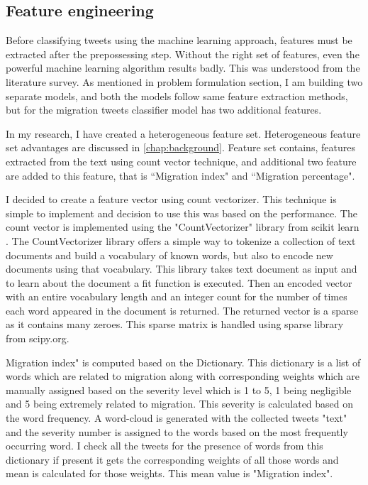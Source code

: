 \subsection{Feature engineering} \label{featureengineering}


 
Before classifying tweets using the machine learning approach, features must be extracted after the prepossessing step. Without the right set of features, even the powerful machine learning algorithm results badly. This was understood from the literature survey. As mentioned in problem formulation section, I am building two separate models, and both the models follow same feature extraction methods, but for the migration tweets classifier model has two additional features.

In my research, I have created a heterogeneous feature set. Heterogeneous feature set advantages are discussed in \ref{chap:background}. Feature set contains, features extracted from the text using count vector technique, and additional two feature are added to this feature, that is ``Migration index" and ``Migration percentage".   

I decided to create a feature vector using count vectorizer. This technique is simple to implement and decision to use this was based on the performance. The count vector is implemented using the "CountVectorizer" library from scikit learn \cite{scikit-learn}. The CountVectorizer library offers a simple way to tokenize a collection of text documents and build a vocabulary of known words, but also to encode new documents using that vocabulary. This library takes text document as input and to learn about the document a fit function is executed. Then an encoded vector with an entire vocabulary length and an integer count for the number of times each word appeared in the document is returned. The returned vector is a sparse as it contains many zeroes. This sparse matrix is handled using sparse library from scipy.org.

Migration index" is computed based on the Dictionary. This dictionary is a list of words which are related to migration along with corresponding weights which are manually assigned based on the severity level which is 1 to 5, 1 being negligible and 5 being extremely related to migration. This severity is calculated based on the word frequency. A word-cloud is generated with the collected tweets "text" and the severity number is assigned to the words based on the most frequently occurring word.
 I check all the tweets for the presence of words from this dictionary if present it gets the corresponding weights of all those words and mean is calculated for those weights. This mean value is "Migration index". 
 


